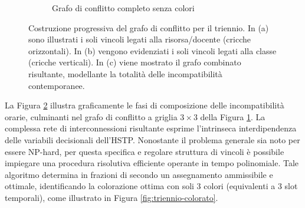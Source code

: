 \begin{figure}[htbp]
\begin{subfigure}[b]{0.48\textwidth}
        \caption{Grafo di conflitto completo senza colori\label{subfig:grafo-completo-grigio}}
    \end{subfigure}
    \caption{Costruzione progressiva del grafo di conflitto per il triennio. In (a) sono illustrati i soli vincoli legati alla risorsa/docente (cricche orizzontali). In (b) vengono evidenziati i soli vincoli legati alla classe (cricche verticali). In (c) viene mostrato il grafo combinato risultante, modellante la totalità delle incompatibilità contemporanee.}
    \label{fig:costruzione-grafo}
\end{figure}

La Figura \ref{fig:costruzione-grafo} illustra graficamente le fasi di composizione delle incompatibilità orarie, culminanti nel grafo di conflitto a griglia $3 \times 3$ della Figura \ref{subfig:grafo-completo-grigio}. La complessa rete di interconnessioni risultante esprime l'intrinseca interdipendenza delle variabili decisionali dell'HSTP. Nonostante il problema generale sia noto per essere NP-hard, per questa specifica e regolare struttura di vincoli è possibile impiegare una procedura risolutiva efficiente operante in tempo polinomiale. Tale algoritmo determina in frazioni di secondo un assegnamento ammissibile e ottimale, identificando la colorazione ottima con soli 3 colori (equivalenti a 3 slot temporali), come illustrato in Figura \ref{fig:triennio-colorato}.

